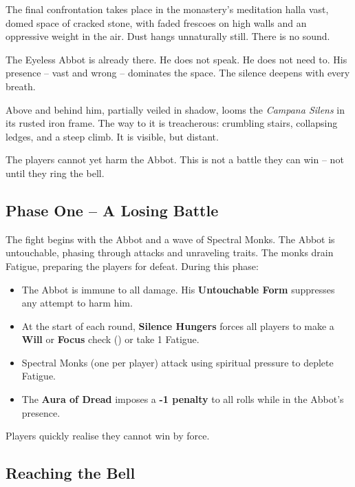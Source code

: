 The final confrontation takes place in the monastery's meditation hall\textemdash{}a vast, domed space of cracked stone, with faded frescoes on high walls and an oppressive weight in the air. Dust hangs unnaturally still. There is no sound.

The Eyeless Abbot is already there. He does not speak. He does not need to. His presence – vast and wrong – dominates the space. The silence deepens with every breath.

Above and behind him, partially veiled in shadow, looms the \emph{Campana Silens} in its rusted iron frame. The way to it is treacherous: crumbling stairs, collapsing ledges, and a steep climb. It is visible, but distant.

The players cannot yet harm the Abbot. This is not a battle they can win – not until they ring the bell.

\subsection*{Phase One – A Losing Battle}

The fight begins with the Abbot and a wave of Spectral Monks. The Abbot is untouchable, phasing through attacks and unraveling traits. The monks drain Fatigue, preparing the players for defeat. During this phase:

\begin{Example}{}
    \begin{itemize}
    \item The Abbot is immune to all damage. His \textbf{Untouchable Form} suppresses any attempt to harm him.
    \item At the start of each round, \textbf{Silence Hungers} forces all players to make a \textbf{Will} or \textbf{Focus} check () or take 1 Fatigue.
    \item Spectral Monks (one per player) attack using spiritual pressure to deplete Fatigue.
    \item The \textbf{Aura of Dread} imposes a \textbf{-1 penalty} to all rolls while in the Abbot's presence.
    \end{itemize}
\end{Example}

\noindent
Players quickly realise they cannot win by force.

\subsection*{Reaching the Bell}



